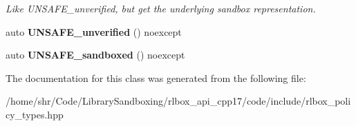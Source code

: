 \begin{DoxyCompactItemize}
\begin{DoxyCompactList}\small\item\em Like U\+N\+S\+A\+F\+E\+\_\+unverified, but get the underlying sandbox representation. \end{DoxyCompactList}\item 
\mbox{\label{classrlbox_1_1sandbox__callback_a8a9a501dd7e47030fabf84491303354f}} 
auto {\bfseries U\+N\+S\+A\+F\+E\+\_\+unverified} () noexcept
\item 
\mbox{\label{classrlbox_1_1sandbox__callback_a7b7969533129c9a5132c6e2b9454b145}} 
auto {\bfseries U\+N\+S\+A\+F\+E\+\_\+sandboxed} () noexcept
\end{DoxyCompactItemize}


The documentation for this class was generated from the following file\+:\begin{DoxyCompactItemize}
\item 
/home/shr/\+Code/\+Library\+Sandboxing/rlbox\+\_\+api\+\_\+cpp17/code/include/rlbox\+\_\+policy\+\_\+types.\+hpp\end{DoxyCompactItemize}
